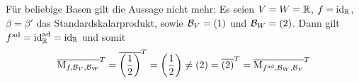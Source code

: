 \subsection{}

Für beliebige Basen gilt die Aussage nicht mehr:
Es seien $V = W = \mathbb{R}$, $f = \operatorname{id}_{\mathbb{R}}$, $\beta = \beta'$ das Standardskalarprodukt, sowie $\mathcal{B}_V = (1)$ und $\mathcal{B}_W = (2)$.
Dann gilt $f^\mathrm{ad} = \operatorname{id}_{\mathbb{R}}^\mathrm{ad} = \operatorname{id}_{\mathbb{R}}$ und somit
\[
        \overline{\operatorname{M}_{f, \mathcal{B}_V, \mathcal{B}_W}}^T
  =     \overline{\left( \frac{1}{2} \right)}^T
  =     \left( \frac{1}{2} \right)
  \neq  (2)
  =     \overline{(2)}^T
  =     \overline{\operatorname{M}_{f^\mathrm{ad}, \mathcal{B}_W, \mathcal{B}_V}}^T
\]
